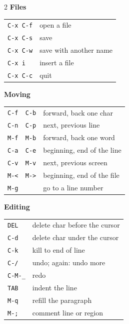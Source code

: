 \documentclass[a4paper,12pt,openany]{book}
\begin{document}
\begin{multicols}{2}
\small
\setlength{\parindent}{0pt}
\textbf{Files}\\[1pt]
{\large
\begin{tabular}{@{}>{\raggedright}p{2.35cm}@{\,}p{6.1cm}@{}}
\texttt{C-x C-f} &open a file\\
\texttt{C-x C-s} &save\\
\texttt{C-x C-w} &save with another name\\
\texttt{C-x i} &insert a file\\
\texttt{C-x C-c} &quit\\
\end{tabular}}
\vspace{7pt}

\textbf{Moving}\\[1pt]
{\large
\begin{tabular}{@{}>{\raggedright}p{2.35cm}@{\,}p{6.1cm}@{}}
\texttt{C-f\,\,C-b} & forward, back one char\\
\texttt{C-n\,\,C-p} & next, previous line\\
\texttt{M-f\,\,M-b} & forward, back one word\\
\texttt{C-a\,\,C-e} & beginning, end of the line\\
\texttt{C-v\,\,M-v} & next, previous screen\\
\texttt{M-<\,\,M->} & beginning, end of the file\\
\texttt{M-g} & go to a line number\\
\end{tabular}}
\vspace{7pt}

\textbf{Editing}\\[1pt]
{\large
\begin{tabular}{@{}>{\raggedright}p{2.35cm}@{\,}p{6.1cm}@{}}
\texttt{DEL} & delete char before the cursor\\
\texttt{C-d} & delete char under the cursor\\
\texttt{C-k} & kill to end of line\\
\texttt{C-/} & undo; again: undo more\\
\texttt{C-M-\_} & redo\\
\texttt{TAB} & indent the line\\
\texttt{M-q} & refill the paragraph\\
\texttt{M-;} & comment line or region\\
\end{tabular}}
\vspace{7pt}


\end{multicols}
\end{document}
